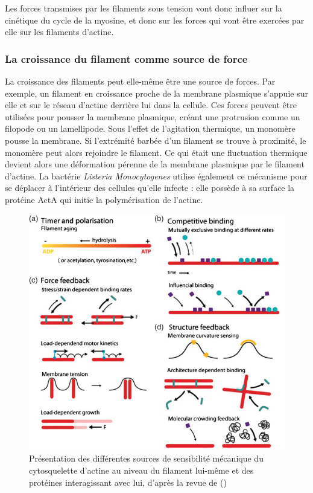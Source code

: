 \documentclass{report}
\begin{document}
Les forces transmises par les filaments sous tension vont donc influer sur la cinétique du cycle de la myosine, et donc sur les forces qui vont être exercées par elle sur les filaments d'actine. 

\subsubsection{La croissance du filament comme source de force}

La croissance des filaments peut elle-même être une source de forces. Par exemple, un filament en croissance proche de la membrane plasmique s'appuie sur elle et sur le réseau d'actine derrière lui dans la cellule. 
Ces forces peuvent être utilisées pour pousser la membrane plasmique, créant une protrusion comme un filopode ou un lamellipode. Sous l'effet de l'agitation thermique, un monomère pousse la membrane. Si l'extrémité barbée d'un filament se trouve à proximité, le monomère peut alors rejoindre le filament. Ce qui était une fluctuation thermique devient alors une déformation pérenne de la membrane plasmique par le filament d'actine. 
La bactérie \textit{Listeria Monocytogenes} utilise également ce mécanisme pour se déplacer à l'intérieur des cellules qu'elle infecte : elle possède à sa surface la protéine ActA qui initie la polymérisation de l'actine. 


\begin{figure}[h!]
\includegraphics[scale=0.7]{Actine_phenomenon.png}
\caption{Présentation des différentes sources de sensibilité mécanique du cytosquelette d'actine au niveau du filament lui-même et des protéines interagissant avec lui, d'après la revue de (\cite{huber_emergent_2013})}
\end{figure}
\end{document}
